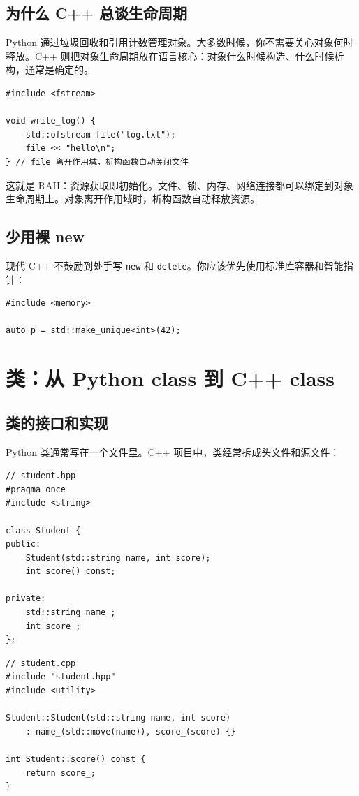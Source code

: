 \documentclass[UTF8,openany]{ctexbook}
\begin{document}
\section{为什么 C++ 总谈生命周期}

Python 通过垃圾回收和引用计数管理对象。大多数时候，你不需要关心对象何时释放。C++ 则把对象生命周期放在语言核心：对象什么时候构造、什么时候析构，通常是确定的。

\begin{lstlisting}[style=cppstyle]
#include <fstream>

void write_log() {
    std::ofstream file("log.txt");
    file << "hello\n";
} // file 离开作用域，析构函数自动关闭文件
\end{lstlisting}

这就是 RAII：资源获取即初始化。文件、锁、内存、网络连接都可以绑定到对象生命周期上。对象离开作用域时，析构函数自动释放资源。

\section{少用裸 new}

现代 C++ 不鼓励到处手写 \texttt{new} 和 \texttt{delete}。你应该优先使用标准库容器和智能指针：

\begin{lstlisting}[style=cppstyle]
#include <memory>

auto p = std::make_unique<int>(42);
\end{lstlisting}

\chapter{类：从 Python class 到 C++ class}

\section{类的接口和实现}

Python 类通常写在一个文件里。C++ 项目中，类经常拆成头文件和源文件：

\begin{lstlisting}[style=cppstyle]
// student.hpp
#pragma once
#include <string>

class Student {
public:
    Student(std::string name, int score);
    int score() const;

private:
    std::string name_;
    int score_;
};
\end{lstlisting}

\begin{lstlisting}[style=cppstyle]
// student.cpp
#include "student.hpp"
#include <utility>

Student::Student(std::string name, int score)
    : name_(std::move(name)), score_(score) {}

int Student::score() const {
    return score_;
}
\end{lstlisting}
\end{document}
